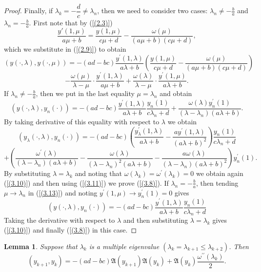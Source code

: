 \documentclass[pdflatex,sn-mathphys-num]{sn-jnl}%
\theoremstyle{thmstyleone}%
\theoremstyle{thmstyletwo}%
\theoremstyle{thmstylethree}%
\newtheorem{lem}[thm]{Lemma}
\theoremstyle{definition}
\theoremstyle{remark}
\numberwithin{equation}{section}
\begin{document}
\begin{proof}
Finally, if $\lambda_k = -\dfrac{d}{c}\neq\lambda_n$, then we need to consider two cases: $\lambda_n\neq-\frac{b}{a}$ and $\lambda_n=-\frac{b}{a}$.
First note that by (\ref{(2.3)}) 
\begin{equation*}
    \frac{y{'}(1,\mu)}{a\mu + b}=\frac{y(1,\mu)}{c\mu + d}-\frac{\omega(\mu)}{(a\mu + b)(c\mu + d)},
\end{equation*}
which we substitute in (\ref{(2.9)}) to obtain 
\[
\left(y(\cdot,\lambda), y(\cdot,\mu)\right)
= -(ad - bc)\frac{y^\prime(1,\lambda)}{a\lambda + b}\left(\frac{y(1,\mu)}{c\mu + d}-\frac{\omega(\mu)}{(a\mu + b)(c\mu + d)} \right)
\]
\begin{equation}
- \frac{\omega({\mu})}{\lambda - {\mu}} \cdot \frac{y^\prime(1,\lambda)}{a{\mu} + b}
+ \frac{\omega(\lambda)}{\lambda - {\mu}} \cdot \frac{{y^\prime(1,\mu)}}{a\lambda + b}.\label{(3.13)}
\end{equation}
If  $\lambda_n\neq-\frac{b}{a}$, then we put in the last equality $\mu=\lambda_n$ and obtain 
\[
\left(y(\cdot,\lambda), y_n(\cdot)\right)
= -(ad - bc)\frac{y^\prime(1,\lambda)}{a\lambda + b}\frac{y_n(1)}{c\lambda_n + d}+\frac{\omega(\lambda)y^\prime_n(1)}{(\lambda-\lambda_n)(a\lambda + b)}.
\]
By taking derivative of this equality with respect to $\lambda$ we obtain 
\[
\left(y_\lambda(\cdot,\lambda), y_n(\cdot)\right)
= -(ad - bc)\left(\frac{y_\lambda^\prime(1,\lambda)}{a\lambda + b}-\frac{ay^\prime(1,\lambda)}{(a\lambda + b)^2}\right)\frac{y_n(1)}{c\lambda_n + d}
\]
\begin{equation*}
    +\left(\frac{\omega^\prime(\lambda)}{(\lambda-\lambda_n)(a\lambda + b)}-\frac{\omega(\lambda)}{(\lambda-\lambda_n)^2(a\lambda + b)}-\frac{a\omega(\lambda)}{(\lambda-\lambda_n)(a\lambda + b)^2}\right)y_n^\prime(1).
\end{equation*}
By substituting $\lambda=\lambda_k$ and noting that $\omega(\lambda_k)=\omega^\prime(\lambda_k)=0 $  we obtain again (\ref{(3.10)}) and then using (\ref{(3.11)}) we prove (\ref{(3.8)}).
If  $\lambda_n=-\frac{b}{a}$, then tending $\mu\to\lambda_n$ in (\ref{(3.13)}) and noting $y^\prime(1,\mu)\to y_n^\prime(1)=0$ gives 
\begin{equation}
   \left(y(\cdot,\lambda), y_n(\cdot)\right)
= -(ad - bc)\frac{y^\prime(1,\lambda)}{a\lambda + b}\frac{y_n(1)}{c\lambda_n + d} \label{(3.14)}
\end{equation}
Taking the derivative with respect to $\lambda$ and then substituting $\lambda=\lambda_k$ gives (\ref{(3.10)}) and finally (\ref{(3.8)}) in this case.
\end{proof}
\begin{lem} Suppose that  $\lambda _{k}$ is a multiple eigenvalue \((\lambda_{k}=\lambda_{k+1} \le\lambda_{k+2})\).
Then 
\begin{equation}
\left( y_{k + 1},y_{k} \right) = - (ad - bc)\mathfrak{A}(y_{k+1})\mathfrak{A}(y_{k})+\mathfrak{A}(y_k)\frac{\omega^{\prime\prime}(\lambda_k)}{2}. \label{(3.16)}
\end{equation}
\end{lem}
\end{document}
